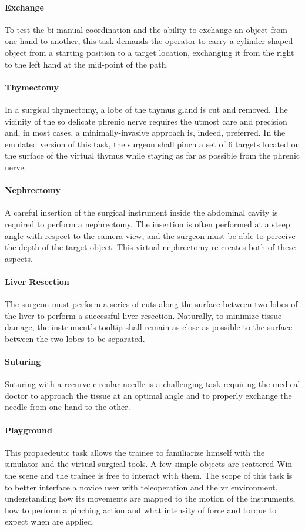 \documentclass[../main.tex]{subfiles}
\begin{document}
\paragraph{Exchange} To test the bi-manual coordination and the ability to exchange an object from one hand to another, this task demands the operator to carry a cylinder-shaped object from a starting position to a target location, exchanging it from the right to the left hand at the mid-point of the path. 
\paragraph{Thymectomy} In a surgical thymectomy, a lobe of the thymus gland is cut and removed. The vicinity of the so delicate phrenic nerve requires the utmost care and precision and, in most cases, a minimally-invasive approach is, indeed, preferred. In the emulated version of this task, the surgeon shall pinch a set of 6 targets located on the surface of the virtual thymus while staying as far as possible from the phrenic nerve. 
\paragraph{Nephrectomy} A careful insertion of the surgical instrument inside the abdominal cavity is required to perform a nephrectomy. The insertion is often performed at a steep angle with respect to the camera view, and the surgeon must be able to perceive the depth of the target object. This virtual nephrectomy re-creates both of these aspects.
\paragraph{Liver Resection} The surgeon must perform a series of cuts along the surface between two lobes of the liver to perform a successful liver resection. Naturally, to minimize tissue damage, the instrument's tooltip shall remain as close as possible to the surface between the two lobes to be separated.
\paragraph{Suturing} Suturing with a recurve circular needle is a challenging task requiring the medical doctor to approach the tissue at an optimal angle and to properly exchange the needle from one hand to the other.  
\paragraph{Playground} This propaedeutic task allows the trainee to familiarize himself with the simulator and the virtual surgical tools. A few simple objects are scattered Win the scene and the trainee is free to interact with them. The scope of this task is to better interface a novice user with teleoperation and the \ac{vr} environment, understanding how its movements are mapped to the motion of the instruments, how to perform a pinching action and what intensity of force and torque to expect when \vfs are applied. 
\end{document}
